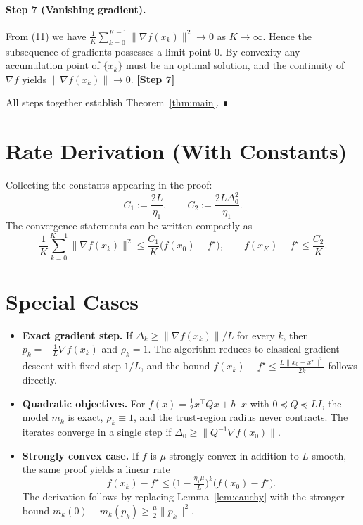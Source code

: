 \documentclass{article}
\begin{document}
\paragraph{Step 7 (Vanishing gradient).}  
From (11) we have $\frac{1}{K}\sum_{k=0}^{K-1}\|\nabla f(x_k)\|^2\to0$ as $K\to\infty$. Hence the subsequence of gradients possesses a limit point $0$. By convexity any accumulation point of $\{x_k\}$ must be an optimal solution, and the continuity of $\nabla f$ yields $\|\nabla f(x_k)\|\to0$. \textbf{[Step 7]}

All steps together establish Theorem~\ref{thm:main}. ∎

\section*{Rate Derivation (With Constants)}
Collecting the constants appearing in the proof:
\[
C_1:=\frac{2L}{\eta_1},\qquad
C_2:=\frac{2L\Delta_0^2}{\eta_1}.
\]
The convergence statements can be written compactly as
\[
\frac{1}{K}\sum_{k=0}^{K-1}\|\nabla f(x_k)\|^2\le\frac{C_1}{K}\big(f(x_0)-f^\star\big),\qquad
f(x_K)-f^\star\le\frac{C_2}{K}.
\]

\section*{Special Cases}
\begin{itemize}
\item \textbf{Exact gradient step.} If $\Delta_k\ge\|\nabla f(x_k)\|/L$ for every $k$, then $p_k=-\frac{1}{L}\nabla f(x_k)$ and $\rho_k=1$. The algorithm reduces to classical gradient descent with fixed step $1/L$, and the bound $f(x_k)-f^\star\le\frac{L\|x_0-x^\star\|^2}{2k}$ follows directly.

\item \textbf{Quadratic objectives.} For $f(x)=\frac12 x^\top Q x+b^\top x$ with $0\preceq Q\preceq L I$, the model $m_k$ is exact, $\rho_k\equiv1$, and the trust‑region radius never contracts. The iterates converge in a single step if $\Delta_0\ge\|Q^{-1}\nabla f(x_0)\|$.

\item \textbf{Strongly convex case.} If $f$ is $\mu$‑strongly convex in addition to $L$‑smooth, the same proof yields a linear rate
\[
f(x_k)-f^\star\le\big(1-\tfrac{\eta_1\mu}{L}\big)^k\big(f(x_0)-f^\star\big).
\]
The derivation follows by replacing Lemma~\ref{lem:cauchy} with the stronger bound
$m_k(0)-m_k(p_k)\ge \tfrac{\mu}{2}\|p_k\|^2$.
\end{itemize}
\end{document}
